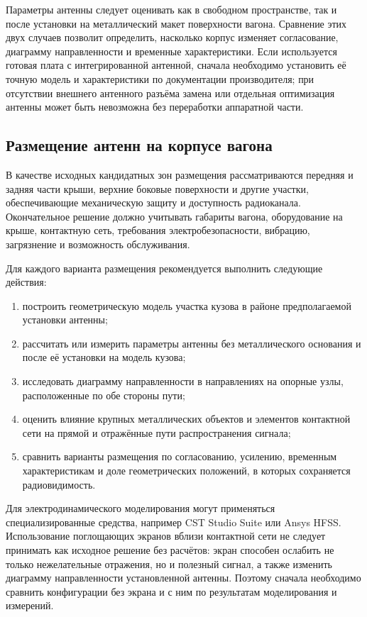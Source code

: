 \documentclass{misisarticle}
\begin{document}
Параметры антенны следует оценивать как в свободном пространстве, так и после установки на металлический макет поверхности вагона. Сравнение этих двух случаев позволит определить, насколько корпус изменяет согласование, диаграмму направленности и временные характеристики. Если используется готовая плата с интегрированной антенной, сначала необходимо установить её точную модель и характеристики по документации производителя; при отсутствии внешнего антенного разъёма замена или отдельная оптимизация антенны может быть невозможна без переработки аппаратной части.

\subsection{Размещение антенн на корпусе вагона}

В качестве исходных кандидатных зон размещения рассматриваются передняя и задняя части крыши, верхние боковые поверхности и другие участки, обеспечивающие механическую защиту и доступность радиоканала. Окончательное решение должно учитывать габариты вагона, оборудование на крыше, контактную сеть, требования электробезопасности, вибрацию, загрязнение и возможность обслуживания.

Для каждого варианта размещения рекомендуется выполнить следующие действия:
\begin{enumerate}
    \item построить геометрическую модель участка кузова в районе предполагаемой установки антенны;
    \item рассчитать или измерить параметры антенны без металлического основания и после её установки на модель кузова;
    \item исследовать диаграмму направленности в направлениях на опорные узлы, расположенные по обе стороны пути;
    \item оценить влияние крупных металлических объектов и элементов контактной сети на прямой и отражённые пути распространения сигнала;
    \item сравнить варианты размещения по согласованию, усилению, временным характеристикам и доле геометрических положений, в которых сохраняется радиовидимость.
\end{enumerate}

Для электродинамического моделирования могут применяться специализированные средства, например CST Studio Suite или Ansys HFSS. Использование поглощающих экранов вблизи контактной сети не следует принимать как исходное решение без расчётов: экран способен ослабить не только нежелательные отражения, но и полезный сигнал, а также изменить диаграмму направленности установленной антенны. Поэтому сначала необходимо сравнить конфигурации без экрана и с ним по результатам моделирования и измерений.
\end{document}
